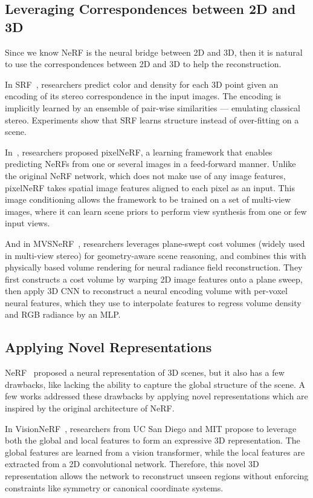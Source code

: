 \documentclass[10pt,twocolumn,letterpaper]{article}
\begin{document}
\subsection{Leveraging Correspondences between 2D and 3D}

Since we know NeRF is the neural bridge between 2D and 3D, then it is natural to use the correspondences between 2D and 3D to help the reconstruction.

In SRF~\cite{SRF}, researchers predict color and density for each 3D point given an encoding of its stereo correspondence in the input images. The encoding is implicitly learned by an ensemble of pair-wise similarities — emulating classical stereo. Experiments show that SRF learns structure instead of over-ﬁtting on a scene.

In~\cite{yu2020pixelnerf}, researchers proposed pixelNeRF, a learning framework that enables predicting NeRFs from one or several images in a feed-forward manner. Unlike the original NeRF network, which does not make use of any image features, pixelNeRF takes spatial image features aligned to each pixel as an input. This image conditioning allows the framework to be trained on a set of multi-view images, where it can learn scene priors to perform view synthesis from one or few input views.

And in MVSNeRF~\cite{mvsnerf}, researchers leverages plane-swept cost volumes (widely used in multi-view stereo) for geometry-aware scene reasoning, and combines this with physically based volume rendering for neural radiance field reconstruction.
They first constructs a cost volume by warping 2D image features onto a plane sweep, then apply 3D CNN to reconstruct a neural encoding volume with per-voxel neural features, which they use to interpolate features to regress volume density and RGB radiance by an MLP.

\subsection{Applying Novel Representations}

NeRF~\cite{mildenhall2020nerf} proposed a neural representation of 3D scenes, but it also has a few drawbacks, like lacking the ability to capture the global structure of the scene. A few works addressed these drawbacks by applying novel representations which are inspired by the original architecture of NeRF.

In VisionNeRF~\cite{lin2023visionnerf}, researchers from UC San Diego and MIT propose to leverage both the global and local features to form an expressive 3D representation. The global features are learned from a vision transformer, while the local features are extracted from a 2D convolutional network. 
Therefore, this novel 3D representation allows the network to reconstruct unseen regions without enforcing constraints like symmetry or canonical coordinate systems.
\end{document}
